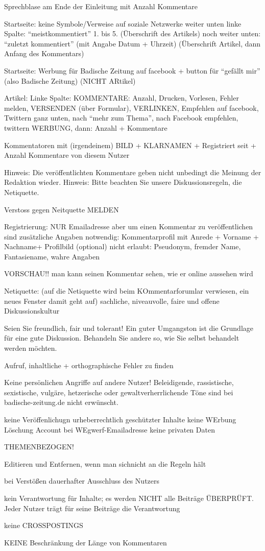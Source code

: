 Sprechblase am Ende der Einleitung mit Anzahl Kommentare

Startseite: keine Symbole/Verweise auf soziale Netzwerke
weiter unten linke Spalte: ``meistkommentiert'' 1. bis 5. (Überschrift des Artikels)
noch weiter unten: ``zuletzt kommentiert'' (mit Angabe Datum + Uhrzeit) (Überschrift Artikel, dann Anfang des Kommentars)

Startseite:
Werbung für Badische Zeitung auf facebook + button für ``gefällt mir'' (also Badische Zeitung) (NICHT ARtikel)

Artikel: 
Linke Spalte: KOMMENTARE: Anzahl, Drucken, Vorlesen, Fehler melden, VERSENDEN (über Formular), VERLINKEN, Empfehlen auf facebook, Twittern
ganz unten, nach ``mehr zum Thema'', nach Facebook empfehlen, twittern WERBUNG, dann: Anzahl + Kommentare

Kommentatoren mit (irgendeinem) BILD + KLARNAMEN + Registriert seit + Anzahl Kommentare von diesem Nutzer

Hinweis: Die veröffentlichten Kommentare geben nicht unbedingt die Meinung der Redaktion wieder.
Hinweis: Bitte beachten Sie unsere Diskussionsregeln, die Netiquette.



Verstoss gegen Neitquette MELDEN

Registrierung:
NUR Emailadresse
aber um einen Kommentar zu veröffentlichen sind zusätzliche Angaben notwendig: 
 Kommentarprofil mit Anrede + Vorname + Nachname+ Profilbild (optional) 
 nicht erlaubt: Pseudonym, fremder Name, Fantasiename, wahre Angaben
 
 
 VORSCHAU!! man kann seinen Kommentar sehen, wie er online aussehen wird
 
 
 Netiquette: (auf die Netiquette wird beim KOmmentarforumlar verwiesen, ein neues Fenster damit geht auf)
 sachliche, niveauvolle, faire und offene Diskussionskultur
 
Seien Sie freundlich, fair und tolerant! Ein guter Umgangston ist die Grundlage für eine gute Diskussion. Behandeln Sie andere so, wie Sie selbst behandelt werden möchten.

Aufruf, inhaltliche + orthographische Fehler zu finden

Keine persönlichen Angriffe auf andere Nutzer! Beleidigende, rassistische, sexistische, vulgäre, hetzerische oder gewaltverherrlichende Töne sind bei badische-zeitung.de nicht erwünscht.

keine Veröffenlichugn urheberrechtlich geschützter Inhalte
keine WErbung 
Löschung Account bei WEgwerf-Emailadresse
keine privaten Daten

THEMENBEZOGEN!

Editieren und Entfernen, wenn man sichnicht an die Regeln hält

bei Verstößen dauerhafter Ausschluss des Nutzers

kein Verantwortung für Inhalte; es werden NICHT alle Beiträge ÜBERPRÜFT. Jeder Nutzer trägt für seine Beiträge die Verantwortung

keine CROSSPOSTINGS


KEINE Beschränkung der Länge von Kommentaren